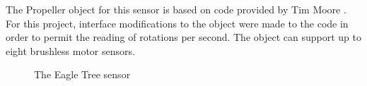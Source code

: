 \documentclass{article}
\numberwithin{equation}{section} %
\begin{document}
The Propeller object for this sensor is based on code provided by Tim Moore \cite{eaglerpmobject} . For this project, interface modifications to the object were made to the code in order to permit the reading of rotations per second. The object can support up to eight brushless motor sensors. 

\begin{figure}[ht]
\centering
{}
\label{fig:subfigureExample}
\caption[Optional caption for list of figures]{The Eagle Tree sensor}
\end{figure}
\end{document}

